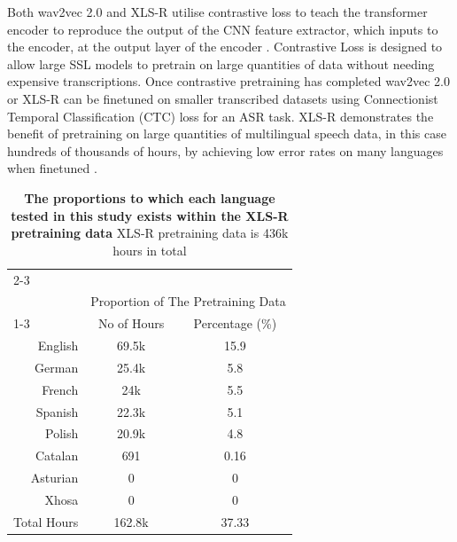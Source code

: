 Both wav2vec 2.0 and XLS-R utilise contrastive loss to teach the transformer encoder to reproduce the output of the CNN feature extractor, which inputs to the encoder, at the output layer of the encoder \cite{wav2vec, XLSR-53, babu2021xlsr}. Contrastive Loss is designed to allow large SSL models to pretrain on large quantities of data without needing expensive transcriptions. Once contrastive pretraining has completed wav2vec 2.0 or XLS-R can be finetuned on smaller transcribed datasets using Connectionist Temporal Classification (CTC) loss for an ASR task. XLS-R demonstrates the benefit of pretraining on large quantities of multilingual speech data, in this case hundreds of thousands of hours, by achieving low error rates on many languages when finetuned \cite{babu2021xlsr, FLEURS_XLSR_WHISPER}.

\begin{table}[h]
\centering
\begin{tabular}{lll}
\cline{2-3} \\[-2ex]
 & \multicolumn{2}{c}{Proportion of The Pretraining Data} \\ \cline{1-3} 
\multicolumn{1}{r|}{Language} & \multicolumn{1}{c}{No of Hours} & \multicolumn{1}{c}{Percentage (\%)} \\ \hline
\multicolumn{1}{r|}{English} & \multicolumn{1}{c}{69.5k} & \multicolumn{1}{c}{15.9} \\ %
\multicolumn{1}{r|}{German} & \multicolumn{1}{c}{25.4k} & \multicolumn{1}{c}{5.8} \\ %
\multicolumn{1}{r|}{French} & \multicolumn{1}{c}{24k} & \multicolumn{1}{c}{5.5} \\ %
\multicolumn{1}{r|}{Spanish} & \multicolumn{1}{c}{22.3k} & \multicolumn{1}{c}{5.1} \\ %
\multicolumn{1}{r|}{Polish} & \multicolumn{1}{c}{20.9k} & \multicolumn{1}{c}{4.8} \\ %
\multicolumn{1}{r|}{Catalan} & \multicolumn{1}{c}{691} & \multicolumn{1}{c}{0.16} \\ 
\multicolumn{1}{r|}{Asturian} & \multicolumn{1}{c}{0} & \multicolumn{1}{c}{0} \\
\multicolumn{1}{r|}{Xhosa} & \multicolumn{1}{c}{0} & \multicolumn{1}{c}{0} \\\hline
\multicolumn{1}{r|}{Total Hours} & \multicolumn{1}{c}{162.8k} & \multicolumn{1}{c}{37.33}   %
\end{tabular}
\caption{\textbf{The proportions to which each language tested in this study exists within the XLS-R pretraining data} XLS-R pretraining data is 436k hours in total}%
\label{pru_tab:XLSR_Data_Splits}
\end{table}

